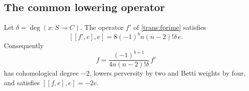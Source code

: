 \subsection{The common lowering operator}

\begin{proposition}\label{calc:double-commutator}
Let $\delta=\deg(x:S\to C)$.  The operator $f'$ of
\eqref{trans:fprime} satisfies
\begin{equation}\label{calc:scalar}
 [[f',e],e]=8(-1)^b n(n-2)!\delta\,e.
\end{equation}
Consequently
\begin{equation}\label{calc:f}
 f=\frac{(-1)^{b+1}}{4n(n-2)!\delta}\,f'
\end{equation}
has cohomological degree $-2$, lowers perversity by two and Betti weights
by four, and satisfies $[[f,e],e]=-2e$.
\end{proposition}


